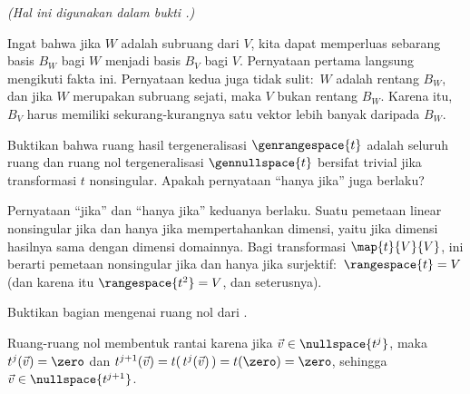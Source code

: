 \begin{exercises}
    \textit{(Hal ini digunakan dalam bukti
             .)}
    \begin{answer}
      Ingat bahwa jika $W$ adalah subruang dari $V$, kita dapat memperluas
      sebarang basis $B_W$ bagi $W$ menjadi basis $B_V$ bagi $V$.
      Pernyataan pertama langsung mengikuti fakta ini.
      Pernyataan kedua juga tidak sulit:~$W$ adalah rentang $B_W$, dan jika $W$
      merupakan subruang sejati, maka $V$ bukan rentang $B_W$. Karena itu,
      $B_V$ harus memiliki sekurang-kurangnya satu vektor lebih banyak daripada
      $B_W$.
    \end{answer}
  \recommended\item 
    Buktikan bahwa ruang hasil tergeneralisasi $\genrangespace{t}$ adalah seluruh
    ruang dan ruang nol tergeneralisasi $\gennullspace{t}$ bersifat trivial jika
    transformasi $t$ nonsingular.
    Apakah pernyataan ``hanya jika'' juga berlaku?
    \begin{answer}
      Pernyataan ``jika'' dan ``hanya jika'' keduanya berlaku.
      Suatu pemetaan linear nonsingular jika dan hanya jika mempertahankan
      dimensi, yaitu jika dimensi hasilnya sama dengan dimensi domainnya.
      Bagi transformasi $\map{t}{V}{V}$, ini berarti pemetaan nonsingular jika
      dan hanya jika surjektif:~$\rangespace{t}=V$ (dan karena itu
      $\rangespace{t^2}=V$, dan seterusnya).
    \end{answer}
  \item \label{exer:RangeAndNullChains} 
    Buktikan bagian mengenai ruang nol dari
    .
    \begin{answer}
      Ruang-ruang nol membentuk rantai karena jika
      $\vec{v}\in\nullspace{t^j}$, maka $t^j(\vec{v})=\zero$ dan
      $t^{j+1}(\vec{v})=t(\,t^j(\vec{v})\,)=t(\zero)=\zero$, sehingga
      $\vec{v}\in\nullspace{t^{j+1}}$.


\end{answer}
\end{exercises}
